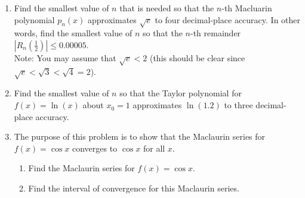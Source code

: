 \documentclass[12pt]{article}
\newif\ifans
\begin{document}
\begin{enumerate}
\item Find the smallest value of $n$ that is needed so that the $n$-th Macluarin polynomial $p_n(x)$ approximates $\sqrt{e}$ to four decimal-place accuracy.  In other words, find the smallest value of $n$
so that the $n$-th remainder $\textstyle |R_n(\frac{1}{2})| \leq 0.00005$.
\\ Note: You may assume that $\sqrt{e} < 2$ (this should be clear since $\sqrt{e}<\sqrt{3}<\sqrt{4}=2$). 

\ifans{\fbox{\parbox{1\linewidth}{Note that $f(x)=e^x$ is an increasing function and $f^{(n)}(x)=e^x$ for all $n$.  So for all $x$ on the interval $\textstyle [0, \frac{1}{2}]$  we have $|f^{(n+1)}(x)| = e^x \leq e^{\frac{1}{2}} < 2$
, and so by the Remainder Estimation Theorem, $\textstyle |R_n(\frac{1}{2})| \leq \frac{2}{(n+1)!} \left(\frac{1}{2} - 0 \right)^{n+1} = \frac{1}{2^n (n+1)!}$.
\\ \\ So we want $\textstyle \frac{1}{2^n (n+1)!} \leq 0.00005$, or $2^n (n+1)! \geq 20,000$.
\\ For $n=4: 2^4(5!) = 16(120) < 20,000$.
\\ For $n=5: 2^5(6!) = 32(720) > 20,000$.
\\ So we should let $n=5$, i.e. the $5$-th Macluarin polynomial for $e^{x}$ approximates $\sqrt{e}$ to four decimal-place accuracy. }}} \fi

\item Find the smallest value of $n$ so that the Taylor polynomial for $f(x)=\ln(x)$ about $x_0=1$ approximates $\ln(1.2)$ to three decimal-place accuracy.

\ifans{\fbox{$n=3$.; Detailed Solution: \textcolor{blue}{\href{http://www.math.drexel.edu/classes/Calculus/resources/Math123HW/Solutions/123_13_Convergence_Of_Taylor_Series_04.pdf}{Here}}}} \fi

\item The purpose of this problem is to show that the Maclaurin series for $f(x)=\cos{x}$ converges to $\cos{x}$ for all $x$.

\begin{enumerate}

\item Find the Maclaurin series for $f(x)=\cos{x}$.

\ifans{\fbox{$\sum_{k=0}^{\infty}{\frac{(-1)^k x^{2k}}{(2k)!}}$. }} \fi

\item Find the interval of convergence for this Maclaurin series.


\end{enumerate}
\end{enumerate}
\end{document}
